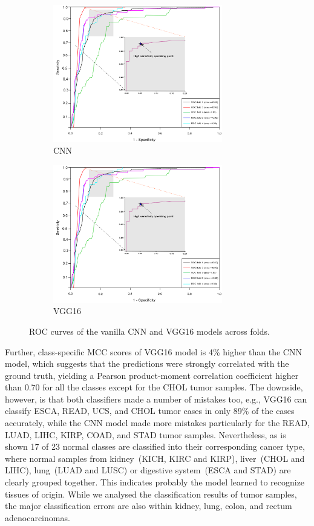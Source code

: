 \begin{figure}
	\centering
	\begin{subfigure}{.48\linewidth}
		\centering
		\includegraphics[width=\linewidth,height=60mm]{images/roc_1000_genome.PNG}
		\caption{CNN}
        \label{fig:roc_cnn}
	\end{subfigure}
	\begin{subfigure}{0.48\linewidth}
		\centering
		\includegraphics[width=\linewidth,height=60mm]{images/roc_1000_genome.PNG}
		\caption{VGG16}
        \label{fig:roc_vgg16}
	\end{subfigure}
	\caption{ROC curves of the vanilla CNN and VGG16 models across folds.} 
	\label{fig:rocs}
	\vspace{-4mm}
\end{figure}

\hspace*{3.5mm} Further, class-specific MCC scores of VGG16 model is 4\% higher than the CNN model, which suggests that the predictions were strongly correlated with the ground truth, yielding a Pearson product-moment correlation coefficient higher than 0.70 for all the classes except for the CHOL tumor samples. The downside, however, is that both classifiers made a number of mistakes too, e.g., VGG16 can classify ESCA, READ, UCS, and CHOL tumor cases in only 89\% of the cases accurately, while the CNN model made more mistakes particularly for the READ, LUAD, LIHC, KIRP, COAD, and STAD tumor samples. Nevertheless, as is shown 17 of 23 normal classes are classified into their corresponding cancer type, where normal samples from kidney~(KICH, KIRC and KIRP), liver~(CHOL and LIHC), lung~(LUAD and LUSC) or digestive system~(ESCA and STAD) are clearly grouped together. This indicates probably the model learned to recognize tissues of origin. While we analysed the classification results of tumor samples, the major classification errors are also within kidney, lung, colon, and rectum adenocarcinomas.

